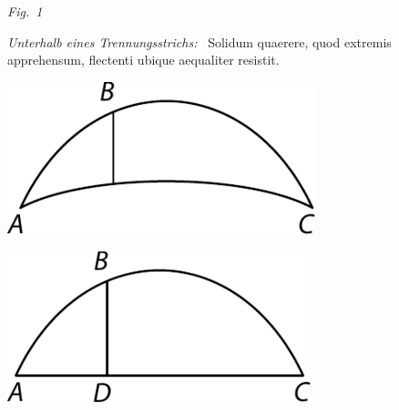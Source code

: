   \centerline{\lbrack\textit{Fig.~1}\rbrack}%
  \label{LH_35_09_14_003r_Fig.1}%
  \vspace{2.5em}%
%
%
\pstart%
\noindent%
%
%
\lbrack\textit{Unterhalb eines Trennungsstrichs:}\rbrack\
\pend%
\vspace{0.5em}
\pstart%
\noindent%
Solidum quaerere,
quod extremis apprehensum,
flectenti ubique aequaliter resistit.%
\protect{}
\pend%
\count{}
\count{}
\count{}
%
%
\vspace{2.5em} 
\pstart 
\begin{minipage}[t]{0.5\textwidth}
\hspace{6mm}\includegraphics[width=0.67\textwidth]{gesamttex/edit_VIII,3/images/LH_35_09_14_003r_d2.pdf}
\end{minipage}
\hspace{7mm}
\begin{minipage}[t]{0.5\textwidth}
\includegraphics[width=0.66\textwidth]{gesamttex/edit_VIII,3/images/LH_35_09_14_003r_d3.pdf}
\end{minipage}
